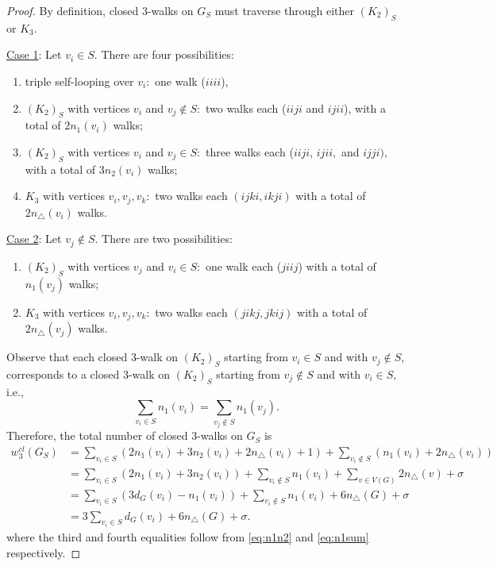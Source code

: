 \documentclass[12pt,a4paper,reqno]{amsart}
\numberwithin{equation}{section}
\theoremstyle{plain}
\theoremstyle{definition}
\newcommand{\<}{\langle}
\renewcommand{\>}{\rangle}
\begin{document}
\begin{proof}
By definition, closed 3-walks on $G_S$ must traverse through either $(K_2)_S$ or $K_3$. %

\underline{Case 1}: Let $v_i \in S.$ There are four possibilities: %
\begin{enumerate}
    \item triple self-looping over $v_i:$ one walk ($iiii$),
    \item $(K_2)_S$ with vertices $v_i$ and $v_j \notin S:$ two walks each ($iiji$ and $ijii$), with a total of \textbf{$2n_1(v_i)$} walks;
    \item $(K_2)_S$ with vertices $v_i$ and $v_j \in S:$ three walks each ($iiji$, $ijii,$ and $ijji),$ with a total of \textbf{$3n_2(v_i)$} walks;
    \item $K_3$ with vertices $v_i,v_j,v_k:$ two walks each $(ijki, ikji)$ with a total of $2n_\triangle(v_i)$ walks. 
\end{enumerate}

\underline{Case 2}: Let $v_j \notin S.$ There are two possibilities:
\begin{enumerate}
    \item $(K_2)_S$ with vertices $v_j$ and $v_i \in S:$ one walk each ($jiij$) with a total of \textbf{$n_1(v_j)$} walks;
    \item $K_3$ with vertices $v_i,v_j,v_k:$ two walks each $(jikj, jkij)$ with a total of $2n_\triangle(v_j)$ walks. 
\end{enumerate}

Observe that each closed 3-walk on $(K_2)_S$ starting from $v_i \in S$ and with $v_j \notin S,$ corresponds to a closed 3-walk on $(K_2)_S$ starting from $v_j \notin S$ and with $v_i \in S,$ i.e.,
\begin{equation}
\label{eq:n1sum}
\sum_{v_i \in S} n_1(v_i) = \sum_{v_j \notin S} n_1(v_j).
\end{equation}
Therefore, the total number of closed 3-walks on $G_S$ is 
\begin{align*}
w_3^{cl}(G_S)
&= \sum_{v_i \in S} \left(2 n_1(v_i) + 3n_2(v_i) + 2n_\triangle(v_i) +1 \right) + 
\sum_{v_i \notin S} \left( n_1(v_i) + 2n_\triangle(v_i) \right) \\
&= \sum_{v_i \in S} \left(2 n_1(v_i) + 3n_2(v_i)\right) + \sum_{v_i \notin S} n_1(v_i) + \sum_{v \in V(G)} 2n_\triangle(v) + \sigma \\
&=\sum_{v_i \in S} \left(3 d_G(v_i) - n_1(v_i) \right) + \sum_{v_i \notin S} n_1(v_i) + 6 n_\triangle(G) + \sigma \\
&= 3\sum_{v_i \in S} d_G(v_i) + 6 n_\triangle(G) + \sigma. 
\end{align*}
where the third and fourth equalities follow from \eqref{eq:n1n2} and \eqref{eq:n1sum} respectively.
\end{proof}
\end{document}
